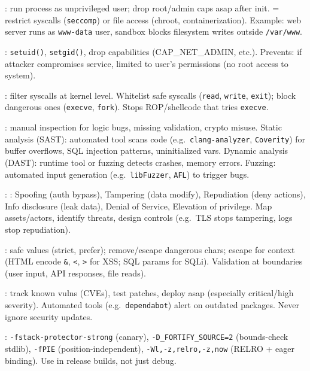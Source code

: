 : run process as unprivileged user; drop root/admin caps asap after init.  = restrict syscalls (\texttt{seccomp}) or file access (chroot, containerization). Example: web server runs as \texttt{www-data} user, sandbox blocks filesystem writes outside \texttt{/var/www}.

: \texttt{setuid()}, \texttt{setgid()}, drop capabilities (CAP\_NET\_ADMIN, etc.). Prevents: if attacker compromises service, limited to user's permissions (no root access to system).

: filter syscalls at kernel level. Whitelist safe syscalls (\texttt{read}, \texttt{write}, \texttt{exit}); block dangerous ones (\texttt{execve}, \texttt{fork}). Stops ROP/shellcode that tries \texttt{execve}.

: manual inspection for logic bugs, missing validation, crypto misuse. Static analysis (SAST): automated tool scans code (e.g.\ \texttt{clang-analyzer}, \texttt{Coverity}) for buffer overflows, SQL injection patterns, uninitialized vars. Dynamic analysis (DAST): runtime tool or fuzzing detects crashes, memory errors. Fuzzing: automated input generation (e.g.\ \texttt{libFuzzer}, \texttt{AFL}) to trigger bugs.

: : Spoofing (auth bypass), Tampering (data modify), Repudiation (deny actions), Info disclosure (leak data), Denial of Service, Elevation of privilege. Map assets/actors, identify threats, design controls (e.g.\ TLS stops tampering, logs stop repudiation).

:  safe values (strict, prefer);  remove/escape dangerous chars;  escape for context (HTML encode \texttt{\&}, \texttt{<}, \texttt{>} for XSS; SQL params for SQLi). Validation at boundaries (user input, API responses, file reads).

: track known vulns (CVEs), test patches, deploy asap (especially critical/high severity). Automated tools (e.g.\ \texttt{dependabot}) alert on outdated packages. Never ignore security updates.

: \texttt{-fstack-protector-strong} (canary), \texttt{-D\_FORTIFY\_SOURCE=2} (bounds-check stdlib), \texttt{-fPIE} (position-independent), \texttt{-Wl,-z,relro,-z,now} (RELRO + eager binding). Use in release builds, not just debug.
